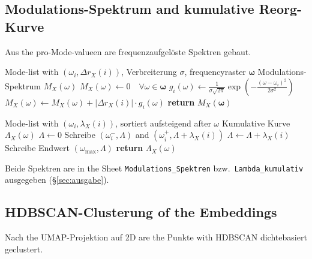 \documentclass[11pt,a4paper,twoside]{article}
\theoremstyle{remark}
\begin{document}
\subsection{Modulations-Spektrum and kumulative Reorg-Kurve}
\label{app:pseudo-spektren}

Aus the pro-Mode-valueen are frequenzaufgel\"oste Spektren gebaut.

\begin{algorithm}[H]
\caption{\textsc{ModulationsSpectrum}}
\begin{algorithmic}[1]
\Require Mode-list with $(\omega_i, \Delta r_X(i))$, Verbreiterung $\sigma$,
         frequencyraster $\boldsymbol{\omega}$
\Ensure Modulations-Spektrum $M_X(\omega)$
\State $M_X(\omega) \gets 0 \quad \forall \omega \in \boldsymbol{\omega}$
  \State $g_i(\omega) \gets \frac{1}{\sigma\sqrt{2\pi}}
         \exp\!\left(-\frac{(\omega - \omega_i)^2}{2\sigma^2}\right)$
  \State $M_X(\omega) \gets M_X(\omega) + |\Delta r_X(i)| \cdot g_i(\omega)$
\EndFor
\State \textbf{return} $M_X(\boldsymbol{\omega})$
\end{algorithmic}
\end{algorithm}

\begin{algorithm}[H]
\caption{\textsc{KumulativeReorg}}
\begin{algorithmic}[1]
\Require Mode-list with $(\omega_i, \lambda_X(i))$, sortiert aufsteigend after $\omega$
\Ensure Kumulative Kurve $\Lambda_X(\omega)$
\State $\Lambda \gets 0$
  \State Schreibe $(\omega_i^-, \Lambda)$ and $(\omega_i^+, \Lambda + \lambda_X(i))$
  \State $\Lambda \gets \Lambda + \lambda_X(i)$
\EndFor
\State Schreibe Endwert $(\omega_\text{max}, \Lambda)$
\State \textbf{return} $\Lambda_X(\omega)$
\end{algorithmic}
\end{algorithm}

Beide Spektren are in the Sheet \texttt{Modulations\_Spektren} bzw.\
\texttt{Lambda\_kumulativ} ausgegeben (\S\ref{sec:ausgabe}).

\subsection{HDBSCAN-Clusterung of the Embeddings}
\label{app:pseudo-hdbscan}

Nach the UMAP-Projektion auf 2D are the Punkte with HDBSCAN
\cite{Campello2013} dichtebasiert geclustert.
\end{document}
